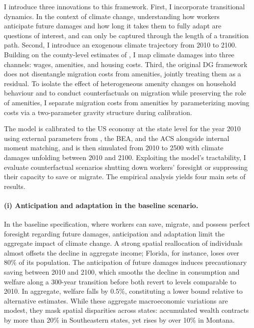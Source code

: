 \documentclass[11pt, a4paper]{article}
\begin{document}
I introduce three innovations to this framework. First, I incorporate transitional dynamics. In the context of climate change, understanding how workers anticipate future damages and how long it takes them to fully adapt are questions of interest, and can only be captured through the length of a transition path. Second, I introduce an exogenous climate trajectory from 2010 to 2100. Building on the county-level estimates of \citet{hsiang_estimating_2017}, I map climate damages into three channels: wages, amenities, and housing costs. Third, the original DG framework does not disentangle migration costs from amenities, jointly treating them as a residual. To isolate the effect of heterogeneous amenity changes on household behaviour and to conduct counterfactuals on migration while preserving the role of amenities, I separate migration costs from amenities by parameterizing moving costs via a two-parameter gravity structure during calibration.

The model is calibrated to the US economy at the state level for the year 2010 using external parameters from \citet{dvorkin_geography_2025}, the BEA, and the ACS alongside internal moment matching, and is then simulated from 2010 to 2500 with climate damages unfolding between 2010 and 2100. Exploiting the model's tractability, I evaluate counterfactual scenarios shutting down workers' foresight or suppressing their capacity to save or migrate. The empirical analysis yields four main sets of results.

\paragraph{(i) Anticipation and adaptation in the baseline scenario.} In the baseline specification, where workers can save, migrate, and possess perfect foresight regarding future damages, anticipation and adaptation limit the aggregate impact of climate change. A strong spatial reallocation of individuals almost offsets the decline in aggregate income; Florida, for instance, loses over 80\% of its population. The anticipation of future damages induces precautionary saving between 2010 and 2100, which smooths the decline in consumption and welfare along a 300-year transition before both revert to levels comparable to 2010. In aggregate, welfare falls by 0.5\%, constituting a lower bound relative to alternative estimates. While these aggregate macroeconomic variations are modest, they mask spatial disparities across states: accumulated wealth contracts by more than 20\% in Southeastern states, yet rises by over 10\% in Montana.
\end{document}
